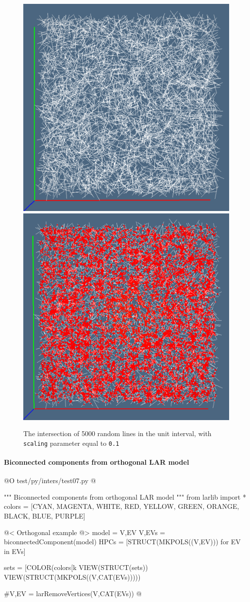 \documentclass[11pt,oneside]{article}    %
\begin{document}
\begin{figure}[htbp] %
   \centering
   \includegraphics[height=0.49\linewidth,width=0.49\linewidth]{images/lineintersect1} 
   \includegraphics[height=0.49\linewidth,width=0.49\linewidth]{images/lineintersect2} 
   \caption{The intersection of 5000 random lines in the unit interval, with \texttt{scaling} parameter equal to \texttt{0.1}}
   \label{fig:example}
\end{figure}


    

\paragraph{Biconnected components from orthogonal LAR model}
@O test/py/inters/test07.py
@{""" Biconnected components from orthogonal LAR model """
from larlib import *
colors = [CYAN, MAGENTA, WHITE, RED, YELLOW, GREEN, ORANGE, BLACK, BLUE, PURPLE]

@< Orthogonal example @>
model = V,EV
V,EVs = biconnectedComponent(model)
HPCs = [STRUCT(MKPOLS((V,EV))) for EV in EVs]

sets = [COLOR(colors[k%
VIEW(STRUCT(sets))
VIEW(STRUCT(MKPOLS((V,CAT(EVs)))))

#V,EV = larRemoveVertices(V,CAT(EVs))
@}
\end{document}
